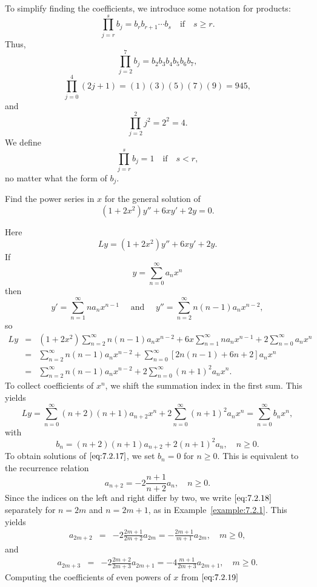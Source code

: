 \documentclass{ximera}
\begin{document}
To simplify
finding the coefficients, we introduce some notation for
products:
$$
\prod^s_{j=r}b_j=b_rb_{r+1}\cdots b_s\quad \mbox{if}
\quad s\geq r.
$$
Thus,
$$
\prod^7_{j=2}b_j=b_2b_3b_4b_5b_6b_7,
$$
$$
\prod^4_{j=0}(2j+1)=(1)(3)(5)(7)(9)=945,
$$
and
$$
\prod^2_{j=2}j^2=2^2=4.
$$
We define
$$
\prod^s_{j=r}b_j=1\quad \mbox{if}\quad s < r,
$$
no matter what the form of $b_j$.

\begin{example}\label{example:7.2.2}
Find the power series in $x$ for the general solution of
\begin{equation}\label{eq:7.2.17}
 (1+2x^2)y''+6xy'+2y=0.
\end{equation}
\begin{explanation}
Here
$$
Ly=(1+2x^2)y''+6xy'+2y.
$$
If
$$
y=\sum_{n=0}^\infty a_nx^n
$$
then
$$
y'=\sum_{n=1}^\infty na_nx^{n-1}\quad\mbox{ and }\quad
y''=\sum_{n=2}^\infty n(n-1)a_nx^{n-2},
$$
so
\begin{eqnarray*}
Ly&=&(1+2x^2) \sum^\infty_{n=2}n(n-1)a_nx^{n-2}+ 6x
 \sum^\infty_{n=1}na_nx^{n-1}
 +2 \sum^\infty_{n=0}a_nx^n\\
&=&\sum_{n=2}^\infty n(n-1)a_nx^{n-2}+\sum_{n=0}^\infty
\left[2n(n-1)+6n+2\right]a_nx^n\\
&=&\sum_{n=2}^\infty n(n-1)a_nx^{n-2}+2\sum_{n=0}^\infty(n+1)^2a_nx^n.
\end{eqnarray*}
To collect coefficients of $x^n$,  we shift the summation index
in the first sum.  This yields
$$
Ly=\sum_{n=0}^\infty(n+2)(n+1)a_{n+2}x^n+2\sum_{n=0}^\infty(n+1)^2a_nx^n
=\sum_{n=0}^\infty b_nx^n,
$$
with
$$
b_n=(n+2)(n+1)a_{n+2}+2(n+1)^2a_n,\quad n\geq0.
$$
To obtain solutions of $\eqref{eq:7.2.17}$, we set $b_n=0$ for $n\geq0$. This
is equivalent to the recurrence relation
 \begin{equation}\label{eq:7.2.18}
a_{n+2}=-2\frac{n+1}{n+2}a_n,\quad n\geq0.
\end{equation}
Since the
indices on the left and right differ by two, we write $\eqref{eq:7.2.18}$
separately for $n=2m$ and $n=2m+1$, as in Example~\ref{example:7.2.1}.
This yields
\begin{eqnarray}
a_{2m+2}&=&-2 \frac{2m+1}{2m+2}a_{2m}=-\frac{2m+1}{m+1}a_{2m},\quad m
\geq0,\label{eq:7.2.19}
\end{eqnarray}
and
\begin{eqnarray}
a_{2m+3}&=&-2\frac{2m+2}{2m+3}a_{2m+1}=-4\frac{m+1}{2m+3}a_{2m+1},\quad
m\geq0. \label{eq:7.2.20}
\end{eqnarray}
Computing the coefficients of even powers of $x$ from $\eqref{eq:7.2.19}$

\end{explanation}
\end{example}
\end{document}
